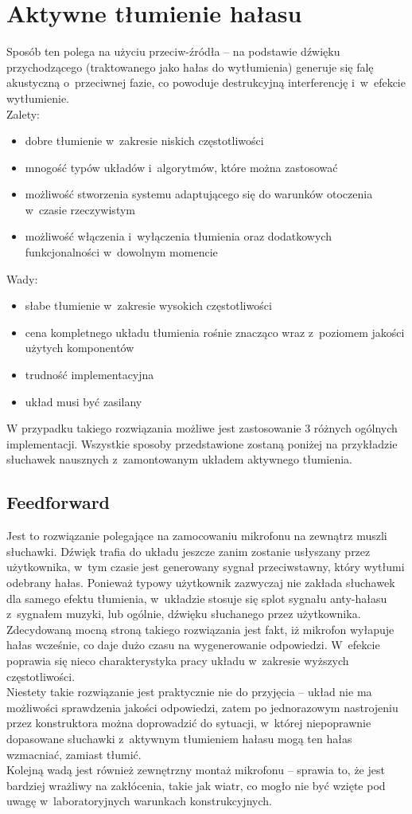 \section{Aktywne tłumienie hałasu}
\label{sec:ANC}
Sposób ten polega na użyciu przeciw-źródła -- na podstawie dźwięku przychodzącego (traktowanego jako hałas do wytłumienia) generuje się falę akustyczną o~przeciwnej fazie, co powoduje destrukcyjną interferencję i~w~efekcie wytłumienie.\\
Zalety:
\begin{itemize}
	\item dobre tłumienie w~zakresie niskich częstotliwości
	\item mnogość typów układów i~algorytmów, które można zastosować
	\item możliwość stworzenia systemu adaptującego się do warunków otoczenia w~czasie rzeczywistym
	\item możliwość włączenia i~wyłączenia tłumienia oraz dodatkowych funkcjonalności w~dowolnym momencie
\end{itemize}
Wady:
\begin{itemize}
	\item słabe tłumienie w~zakresie wysokich częstotliwości
	\item cena kompletnego układu tłumienia rośnie znacząco wraz z~poziomem jakości użytych komponentów
	\item trudność implementacyjna
	\item układ musi być zasilany
\end{itemize}
W przypadku takiego rozwiązania możliwe jest zastosowanie 3 różnych ogólnych implementacji. Wszystkie sposoby przedstawione zostaną poniżej na przykładzie słuchawek nausznych z~zamontowanym układem aktywnego tłumienia.
\subsection{Feedforward}
\label{feedforward}
Jest to rozwiązanie polegające na zamocowaniu mikrofonu na zewnątrz muszli słuchawki. Dźwięk trafia do układu jeszcze zanim zostanie usłyszany przez użytkownika, w~tym czasie jest generowany sygnał przeciwstawny, który wytłumi odebrany hałas. Ponieważ typowy użytkownik zazwyczaj nie zakłada słuchawek dla samego efektu tłumienia, w~układzie stosuje się splot sygnału anty-hałasu z~sygnałem muzyki, lub ogólnie, dźwięku słuchanego przez użytkownika.\\
Zdecydowaną mocną stroną takiego rozwiązania jest fakt, iż mikrofon wyłapuje hałas wcześnie, co daje dużo czasu na wygenerowanie odpowiedzi. W~efekcie poprawia się nieco charakterystyka pracy układu w~zakresie wyższych częstotliwości.\\
Niestety takie rozwiązanie jest praktycznie nie do przyjęcia -- układ nie ma możliwości sprawdzenia jakości odpowiedzi, zatem po jednorazowym nastrojeniu przez konstruktora można doprowadzić do sytuacji, w~której niepoprawnie dopasowane słuchawki z~aktywnym tłumieniem hałasu mogą ten hałas wzmacniać, zamiast tłumić.\\
Kolejną wadą jest również zewnętrzny montaż mikrofonu -- sprawia to, że jest bardziej wrażliwy na zakłócenia, takie jak wiatr, co mogło nie być wzięte pod uwagę w~laboratoryjnych warunkach konstrukcyjnych.
